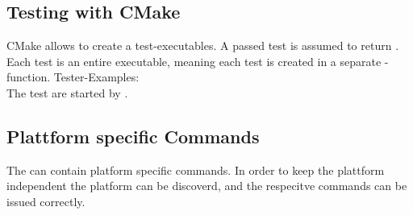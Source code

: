 \newpage
\subsection{Testing with CMake}
CMake allows to create a test-executables. A passed test is assumed to return . Each test is an entire executable, meaning each test is created in a separate -function. Tester-Examples:\\
\TwinLs
{}
{}
The test are started by .




\subsection{Plattform specific Commands}
The  can contain platform specific commands. 
In order to keep the  plattform independent the platform can be discoverd, and the respecitve commands can be issued correctly.
\newpage








